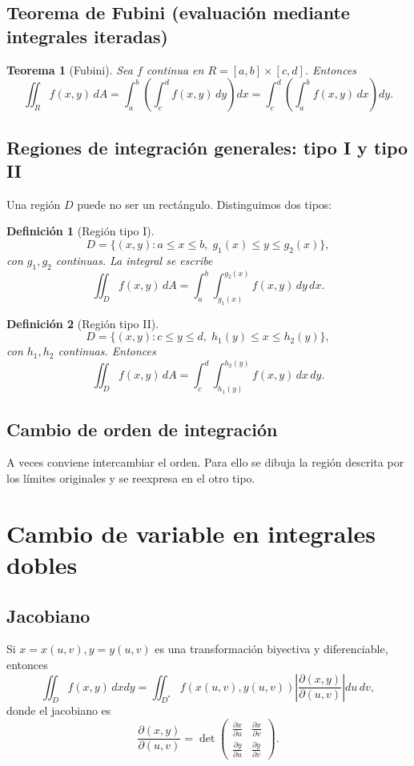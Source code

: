 \documentclass[12pt,spanish]{article}
\newtheorem{definicion}{Definición}[section]
\newtheorem{teorema}{Teorema}[section]
\begin{document}
\subsection{Teorema de Fubini (evaluación mediante integrales iteradas)}
\begin{teorema}[Fubini]
Sea $f$ continua en $R=[a,b]\times[c,d]$. Entonces
\[
\iint_R f(x,y)\,dA = \int_a^b \left(\int_c^d f(x,y)\,dy\right)dx = \int_c^d \left(\int_a^b f(x,y)\,dx\right)dy.
\]
\end{teorema}

\subsection{Regiones de integración generales: tipo I y tipo II}

Una región $D$ puede no ser un rectángulo. Distinguimos dos tipos:

\begin{definicion}[Región tipo I]
\[
D = \{(x,y): a\le x\le b,\; g_1(x)\le y\le g_2(x)\},
\]
con $g_1,g_2$ continuas. La integral se escribe
\[
\iint_D f(x,y)\,dA = \int_a^b \int_{g_1(x)}^{g_2(x)} f(x,y)\,dy\,dx.
\]
\end{definicion}

\begin{definicion}[Región tipo II]
\[
D = \{(x,y): c\le y\le d,\; h_1(y)\le x\le h_2(y)\},
\]
con $h_1,h_2$ continuas. Entonces
\[
\iint_D f(x,y)\,dA = \int_c^d \int_{h_1(y)}^{h_2(y)} f(x,y)\,dx\,dy.
\]
\end{definicion}

\subsection{Cambio de orden de integración}
A veces conviene intercambiar el orden. Para ello se dibuja la región descrita por los límites originales y se reexpresa en el otro tipo.

\section{Cambio de variable en integrales dobles}

\subsection{Jacobiano}
Si $x=x(u,v), y=y(u,v)$ es una transformación biyectiva y diferenciable, entonces
\[
\iint_D f(x,y)\,dxdy = \iint_{D^*} f(x(u,v),y(u,v)) \left| \frac{\partial(x,y)}{\partial(u,v)} \right| du\,dv,
\]
donde el jacobiano es
\[
\frac{\partial(x,y)}{\partial(u,v)} = \det\begin{pmatrix}
\frac{\partial x}{\partial u} & \frac{\partial x}{\partial v} \\
\frac{\partial y}{\partial u} & \frac{\partial y}{\partial v}
\end{pmatrix}.
\]
\end{document}
